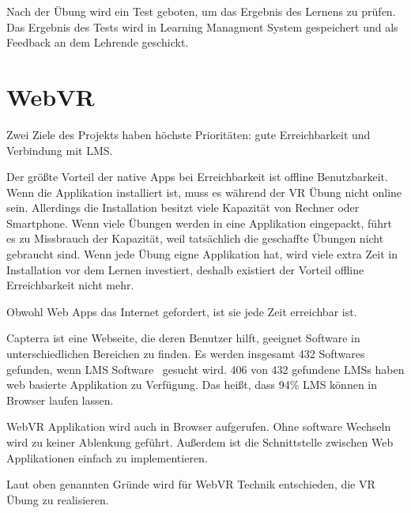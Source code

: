 Nach der Übung wird ein Test geboten, um das Ergebnis des Lernens zu prüfen. Das Ergebnis des Tests wird in Learning Managment System gespeichert und als Feedback an dem Lehrende geschickt.

\section{WebVR}
Zwei Ziele des Projekts haben höchste Prioritäten: gute Erreichbarkeit und Verbindung mit LMS.

Der größte Vorteil der native Apps bei Erreichbarkeit ist offline Benutzbarkeit. Wenn die Applikation installiert ist, muss es während der VR Übung nicht online sein. Allerdings die Installation besitzt viele Kapazität von Rechner oder Smartphone. Wenn viele Übungen werden in eine Applikation eingepackt, führt es zu Missbrauch der Kapazität, weil tatsächlich die geschaffte Übungen nicht gebraucht sind. Wenn jede Übung eigne Applikation hat, wird viele extra Zeit in Installation vor dem Lernen investiert, deshalb existiert der Vorteil offline Erreichbarkeit nicht mehr.

Obwohl Web Apps das Internet gefordert, ist sie jede Zeit erreichbar ist.

Capterra ist eine Webseite, die deren Benutzer hilft, geeignet Software in unterschiedlichen Bereichen zu finden. Es werden insgesamt 432 Softwares gefunden, wenn \glqq LMS Software \grqq\ gesucht wird. 406 von 432 gefundene LMSs haben web basierte Applikation zu Verfügung. Das heißt, dass 94\% LMS können in Browser laufen lassen.

WebVR Applikation wird auch in Browser aufgerufen. Ohne software Wechseln wird zu keiner Ablenkung geführt. Außerdem ist die Schnittstelle zwischen Web Applikationen einfach zu implementieren.

Laut oben genannten Gründe wird für WebVR Technik entschieden, die VR Übung zu realisieren.

